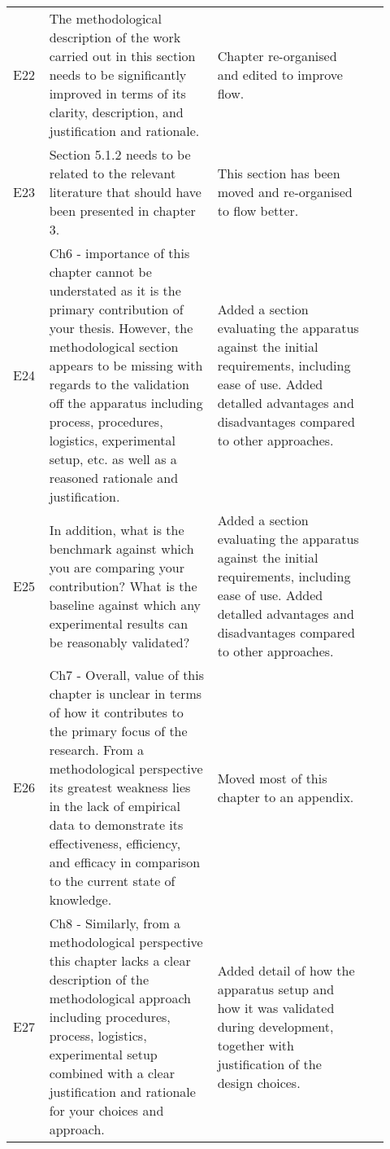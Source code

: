 \begin{longtable}{>{\raggedright} p{0.06\linewidth} | >{\raggedright} p{0.42\linewidth} | >{\raggedright} p{0.39\linewidth} | p{0.045\linewidth}}
    E22 & The methodological description of the work carried out in this section needs to be significantly improved in terms of its clarity, description, and justification and rationale.
    & Chapter re-organised and edited to improve flow. & \p{fs1:intro} \\

    E23 & Section 5.1.2 needs to be related to the relevant literature that should have been presented in chapter 3.
    & This section has been moved and re-organised to flow better. & \p{subsection:engines} \\

    E24 & Ch6 - importance of this chapter cannot be understated as it is the primary contribution of your thesis. However, the methodological section appears to be missing with regards to the validation off the apparatus including process, procedures, logistics, experimental setup, etc. as well as a reasoned rationale and justification.
    & Added a section evaluating the apparatus against the initial requirements, including ease of use. Added detalled advantages and disadvantages compared to other approaches. & \p{validation} \\

    E25 & In addition, what is the benchmark against which you are comparing your contribution? What is the baseline against which any experimental results can be reasonably validated?
    & Added a section evaluating the apparatus against the initial requirements, including ease of use. Added detalled advantages and disadvantages compared to other approaches. & \p{validation} \\

    E26 & Ch7 - Overall, value of this chapter is unclear in terms of how it contributes to the primary focus of the research. From a methodological perspective its greatest weakness lies in the lack of empirical data to demonstrate its effectiveness, efficiency, and efficacy in comparison to the current state of knowledge.
    & Moved most of this chapter to an appendix. & \\

    E27 & Ch8 - Similarly, from a methodological perspective this chapter lacks a clear description of the methodological approach including procedures, process, logistics, experimental setup combined with a clear justification and rationale for your choices and approach.
    & Added detail of how the apparatus setup and how it was validated during development, together with justification of the design choices. & \p{validation} \\


\end{longtable}
